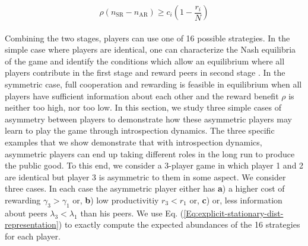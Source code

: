 \documentclass[11pt]{article}
\theoremstyle{plainCl1}
\theoremstyle{plainCl2}
\begin{document}
\begin{equation}
\rho(n_{\mathrm{SR}} - n_{\mathrm{AR}}) \geq c_i \left( 1 - \frac{r_i}{N} \right)
\label{Eq:palrewardsequation}
\end{equation}
\\
\noindent Combining the two stages, players can use one of 16 possible strategies. In the simple case where players are identical, one can characterize the Nash equilibria of the game and identify the conditions which allow an equilibrium where all players contribute in the first stage and reward peers in second stage \cite{Pal:NatCom:2022}. In the symmetric case, full cooperation and rewarding is feasible in equilibrium when all players have sufficient information about each other and the reward benefit $\rho$ is neither too high, nor too low. In this section, we study three simple cases of asymmetry between players to demonstrate how these asymmetric players may learn to play the game through introspection dynamics. The three specific examples that we show demonstrate that with introspection dynamics, asymmetric players can end up taking different roles in the long run to produce the public good. To this end, we consider a 3-player game in which player 1 and 2 are identical but player 3 is asymmetric to them in some aspect. We consider three cases. In each case the asymmetric player either has \textbf{a}) a higher cost of rewarding $\gamma_3 > \gamma_1$  or, \textbf{b}) low productivitiy  $r_3 < r_1$ or, \textbf{c}) or, less information about peers $\lambda_3 < \lambda_1$ than his peers. We use Eq. (\ref{Eq:explicit-stationary-dist-representation}) to exactly compute the expected abundances of the 16 strategies for each player. 
\\ \\
\end{document}
